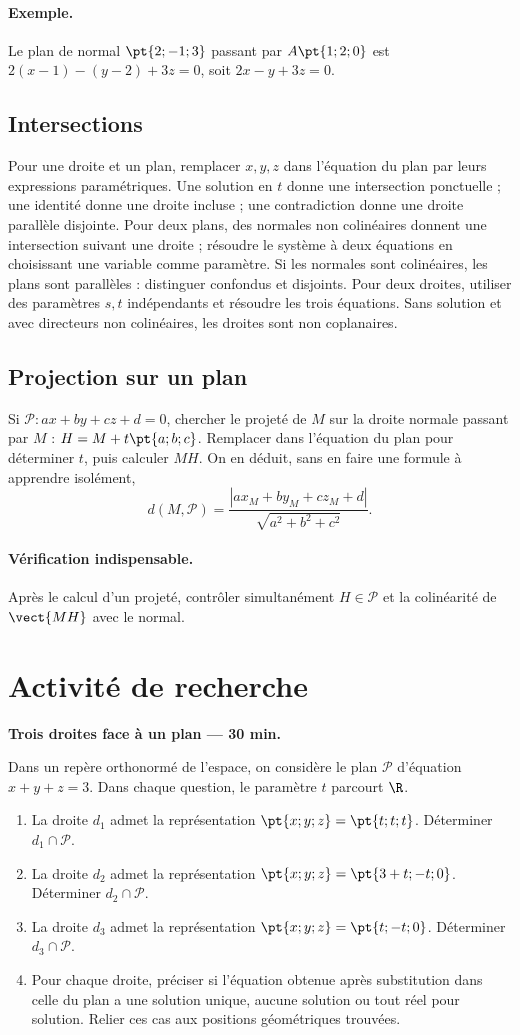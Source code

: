 \paragraph{Exemple.} Le plan de normal $\pt{2;-1;3}$ passant par $A\pt{1;2;0}$ est $2(x-1)-(y-2)+3z=0$, soit $2x-y+3z=0$.
\subsection{Intersections}
Pour une droite et un plan, remplacer $x,y,z$ dans l'équation du plan par leurs expressions paramétriques. Une solution en $t$ donne une intersection ponctuelle ; une identité donne une droite incluse ; une contradiction donne une droite parallèle disjointe.
Pour deux plans, des normales non colinéaires donnent une intersection suivant une droite ; résoudre le système à deux équations en choisissant une variable comme paramètre. Si les normales sont colinéaires, les plans sont parallèles : distinguer confondus et disjoints.
Pour deux droites, utiliser des paramètres $s,t$ indépendants et résoudre les trois équations. Sans solution et avec directeurs non colinéaires, les droites sont non coplanaires.
\subsection{Projection sur un plan}
Si $\mathcal P:ax+by+cz+d=0$, chercher le projeté de $M$ sur la droite normale passant par $M$ : $H=M+t\pt{a;b;c}$. Remplacer dans l'équation du plan pour déterminer $t$, puis calculer $MH$.
On en déduit, sans en faire une formule à apprendre isolément,
\[d(M,\mathcal P)=\frac{|ax_M+by_M+cz_M+d|}{\sqrt{a^2+b^2+c^2}}.\]
\paragraph{Vérification indispensable.} Après le calcul d'un projeté, contrôler simultanément $H\in\mathcal P$ et la colinéarité de $\vect{MH}$ avec le normal.


\mxnewpage
\section{Activité de recherche}\textbf{Trois droites face à un plan --- 30 min.}\par Dans un repère orthonormé de l'espace, on considère le plan $\mathcal P$ d'équation $x+y+z=3$. Dans chaque question, le paramètre $t$ parcourt $\R$.
\begin{enumerate}\item La droite $d_1$ admet la représentation $\pt{x;y;z}=\pt{t;t;t}$. Déterminer $d_1\cap\mathcal P$.
\item La droite $d_2$ admet la représentation $\pt{x;y;z}=\pt{3+t;-t;0}$. Déterminer $d_2\cap\mathcal P$.
\item La droite $d_3$ admet la représentation $\pt{x;y;z}=\pt{t;-t;0}$. Déterminer $d_3\cap\mathcal P$.
\item Pour chaque droite, préciser si l'équation obtenue après substitution dans celle du plan a une solution unique, aucune solution ou tout réel pour solution. Relier ces cas aux positions géométriques trouvées.\end{enumerate}


